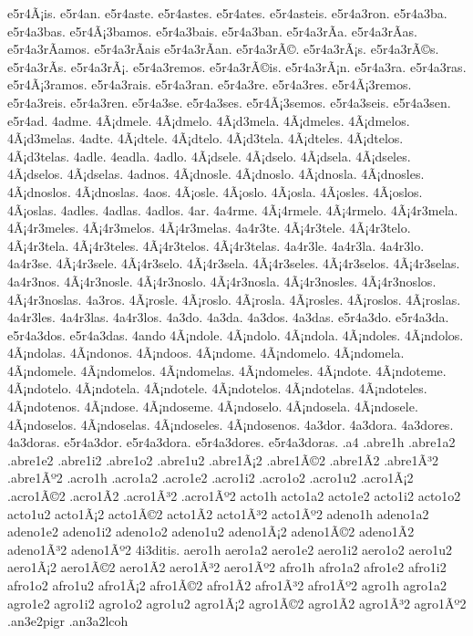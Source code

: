 {e5r4Ã¡is.
e5r4an.
e5r4aste.
e5r4astes.
e5r4ates.
e5r4asteis.
e5r4a3ron.
e5r4a3ba.
e5r4a3bas.
e5r4Ã¡3bamos.
e5r4a3bais.
e5r4a3ban.
e5r4a3rÃ­a.
e5r4a3rÃ­as.
e5r4a3rÃ­amos.
e5r4a3rÃ­ais
e5r4a3rÃ­an.
e5r4a3rÃ©.
e5r4a3rÃ¡s.
e5r4a3rÃ©s.
e5r4a3rÃ­s.
e5r4a3rÃ¡.
e5r4a3remos.
e5r4a3rÃ©is.
e5r4a3rÃ¡n.
e5r4a3ra.
e5r4a3ras.
e5r4Ã¡3ramos.
e5r4a3rais.
e5r4a3ran.
e5r4a3re.
e5r4a3res.
e5r4Ã¡3remos.
e5r4a3reis.
e5r4a3ren.
e5r4a3se.
e5r4a3ses.
e5r4Ã¡3semos.
e5r4a3seis.
e5r4a3sen.
e5r4ad.
4adme.
4Ã¡dmele.
4Ã¡dmelo.
4Ã¡d3mela.
4Ã¡dmeles.
4Ã¡dmelos.
4Ã¡d3melas.
4adte.
4Ã¡dtele.
4Ã¡dtelo.
4Ã¡d3tela.
4Ã¡dteles.
4Ã¡dtelos.
4Ã¡d3telas.
4adle.
4eadla.
4adlo.
4Ã¡dsele.
4Ã¡dselo.
4Ã¡dsela.
4Ã¡dseles.
4Ã¡dselos.
4Ã¡dselas.
4adnos.
4Ã¡dnosle.
4Ã¡dnoslo.
4Ã¡dnosla.
4Ã¡dnosles.
4Ã¡dnoslos.
4Ã¡dnoslas.
4aos.
4Ã¡osle.
4Ã¡oslo.
4Ã¡osla.
4Ã¡osles.
4Ã¡oslos.
4Ã¡oslas.
4adles.
4adlas.
4adlos.
4ar.
4a4rme.
4Ã¡4rmele.
4Ã¡4rmelo.
4Ã¡4r3mela.
4Ã¡4r3meles.
4Ã¡4r3melos.
4Ã¡4r3melas.
4a4r3te.
4Ã¡4r3tele.
4Ã¡4r3telo.
4Ã¡4r3tela.
4Ã¡4r3teles.
4Ã¡4r3telos.
4Ã¡4r3telas.
4a4r3le.
4a4r3la.
4a4r3lo.
4a4r3se.
4Ã¡4r3sele.
4Ã¡4r3selo.
4Ã¡4r3sela.
4Ã¡4r3seles.
4Ã¡4r3selos.
4Ã¡4r3selas.
4a4r3nos.
4Ã¡4r3nosle.
4Ã¡4r3noslo.
4Ã¡4r3nosla.
4Ã¡4r3nosles.
4Ã¡4r3noslos.
4Ã¡4r3noslas.
4a3ros.
4Ã¡rosle.
4Ã¡roslo.
4Ã¡rosla.
4Ã¡rosles.
4Ã¡roslos.
4Ã¡roslas.
4a4r3les.
4a4r3las.
4a4r3los.
4a3do.
4a3da.
4a3dos.
4a3das.
e5r4a3do.
e5r4a3da.
e5r4a3dos.
e5r4a3das.
4ando
4Ã¡ndole.
4Ã¡ndolo.
4Ã¡ndola.
4Ã¡ndoles.
4Ã¡ndolos.
4Ã¡ndolas.
4Ã¡ndonos.
4Ã¡ndoos.
4Ã¡ndome.
4Ã¡ndomelo.
4Ã¡ndomela.
4Ã¡ndomele.
4Ã¡ndomelos.
4Ã¡ndomelas.
4Ã¡ndomeles.
4Ã¡ndote.
4Ã¡ndoteme.
4Ã¡ndotelo.
4Ã¡ndotela.
4Ã¡ndotele.
4Ã¡ndotelos.
4Ã¡ndotelas.
4Ã¡ndoteles.
4Ã¡ndotenos.
4Ã¡ndose.
4Ã¡ndoseme.
4Ã¡ndoselo.
4Ã¡ndosela.
4Ã¡ndosele.
4Ã¡ndoselos.
4Ã¡ndoselas.
4Ã¡ndoseles.
4Ã¡ndosenos.
4a3dor.
4a3dora.
4a3dores.
4a3doras.
e5r4a3dor.
e5r4a3dora.
e5r4a3dores.
e5r4a3doras.
.a4
.abre1h
.abre1a2 .abre1e2 .abre1i2 .abre1o2 .abre1u2
.abre1Ã¡2 .abre1Ã©2 .abre1Ã­2 .abre1Ã³2 .abre1Ãº2
.acro1h
.acro1a2 .acro1e2 .acro1i2 .acro1o2 .acro1u2
.acro1Ã¡2 .acro1Ã©2 .acro1Ã­2 .acro1Ã³2 .acro1Ãº2
acto1h
acto1a2 acto1e2 acto1i2 acto1o2 acto1u2
acto1Ã¡2 acto1Ã©2 acto1Ã­2 acto1Ã³2 acto1Ãº2
adeno1h
adeno1a2 adeno1e2 adeno1i2 adeno1o2 adeno1u2
adeno1Ã¡2 adeno1Ã©2 adeno1Ã­2 adeno1Ã³2 adeno1Ãº2
4i3ditis.
aero1h
aero1a2 aero1e2 aero1i2 aero1o2 aero1u2
aero1Ã¡2 aero1Ã©2 aero1Ã­2 aero1Ã³2 aero1Ãº2
afro1h
afro1a2 afro1e2 afro1i2 afro1o2 afro1u2
afro1Ã¡2 afro1Ã©2 afro1Ã­2 afro1Ã³2 afro1Ãº2
agro1h
agro1a2 agro1e2 agro1i2 agro1o2 agro1u2
agro1Ã¡2 agro1Ã©2 agro1Ã­2 agro1Ã³2 agro1Ãº2
.an3e2pigr
.an3a2lcoh
}
